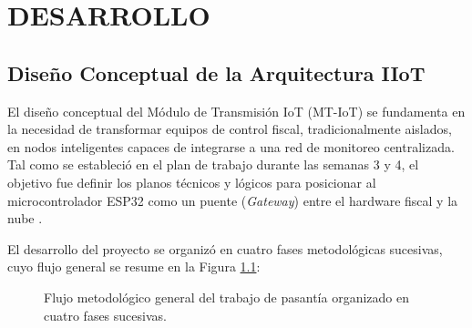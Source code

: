 \chapter{DESARROLLO}

\section{Diseño Conceptual de la Arquitectura IIoT}
\label{sec:diseno_conceptual}

    \par El diseño conceptual del Módulo de Transmisión IoT (MT-IoT) se fundamenta en la necesidad de transformar equipos de control fiscal, tradicionalmente aislados, en nodos inteligentes capaces de integrarse a una red de monitoreo centralizada. Tal como se estableció en el plan de trabajo durante las semanas 3 y 4, el objetivo fue definir los planos técnicos y lógicos para posicionar al microcontrolador ESP32 como un puente (\textit{Gateway}) entre el hardware fiscal y la nube \cite{WEF_IIoT_2018, Connected_Everything_2016}.\\

    \par El desarrollo del proyecto se organizó en cuatro fases metodológicas sucesivas, cuyo flujo general se resume en la Figura \ref{fig:flujo_metodologico}:

    \begin{figure}[htbp]
    \centering
    \caption{Flujo metodológico general del trabajo de pasantía organizado en cuatro fases sucesivas.}
    \label{fig:flujo_metodologico}
    \end{figure}

